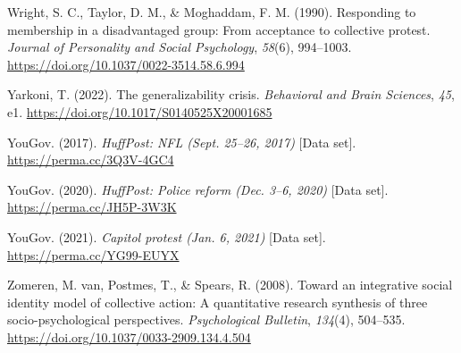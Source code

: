 \documentclass[12pt, letterpaper]{article}
\newenvironment{CSLReferences}[2]{}{}
\begin{document}
\begin{CSLReferences}{1}{0}
\leavevmode{}%
Wright, S. C., Taylor, D. M., \& Moghaddam, F. M. (1990). Responding to
membership in a disadvantaged group: From acceptance to collective
protest. \emph{Journal of Personality and Social Psychology},
\emph{58}(6), 994--1003.
\url{https://doi.org/10.1037/0022-3514.58.6.994}

\leavevmode{}%
Yarkoni, T. (2022). The generalizability crisis. \emph{Behavioral and
Brain Sciences}, \emph{45}, e1.
\url{https://doi.org/10.1017/S0140525X20001685}

\leavevmode{}%
YouGov. (2017). \emph{{HuffPost: NFL} {(Sept. 25--26, 2017)}} {[}Data
set{]}. \url{https://perma.cc/3Q3V-4GC4}

\leavevmode{}%
YouGov. (2020). \emph{{HuffPost}: Police reform {(Dec. 3--6, 2020)}}
{[}Data set{]}. \url{https://perma.cc/JH5P-3W3K}

\leavevmode{}%
YouGov. (2021). \emph{Capitol protest {(Jan. 6, 2021)}} {[}Data set{]}.
\url{https://perma.cc/YG99-EUYX}

\leavevmode{}%
Zomeren, M. van, Postmes, T., \& Spears, R. (2008). Toward an
integrative social identity model of collective action: {A} quantitative
research synthesis of three socio-psychological perspectives.
\emph{Psychological Bulletin}, \emph{134}(4), 504--535.
\url{https://doi.org/10.1037/0033-2909.134.4.504}

\end{CSLReferences}

\endgroup

\newpage

\setcounter{table}{0}
\renewcommand{\thetable}{A\arabic{table}}
\end{document}
